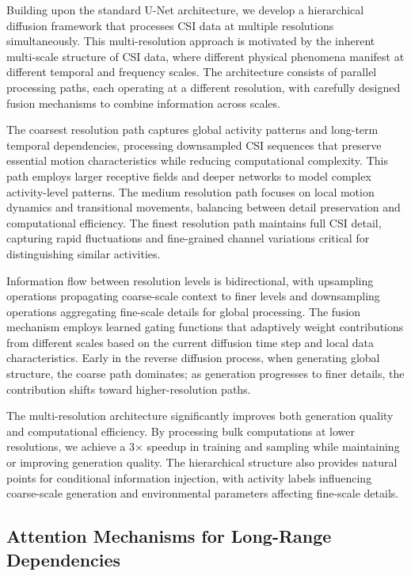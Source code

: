 \documentclass[journal]{IEEEtran}
\begin{document}
Building upon the standard U-Net architecture, we develop a hierarchical diffusion framework that processes CSI data at multiple resolutions simultaneously. This multi-resolution approach is motivated by the inherent multi-scale structure of CSI data, where different physical phenomena manifest at different temporal and frequency scales. The architecture consists of parallel processing paths, each operating at a different resolution, with carefully designed fusion mechanisms to combine information across scales.

The coarsest resolution path captures global activity patterns and long-term temporal dependencies, processing downsampled CSI sequences that preserve essential motion characteristics while reducing computational complexity. This path employs larger receptive fields and deeper networks to model complex activity-level patterns. The medium resolution path focuses on local motion dynamics and transitional movements, balancing between detail preservation and computational efficiency. The finest resolution path maintains full CSI detail, capturing rapid fluctuations and fine-grained channel variations critical for distinguishing similar activities.

Information flow between resolution levels is bidirectional, with upsampling operations propagating coarse-scale context to finer levels and downsampling operations aggregating fine-scale details for global processing. The fusion mechanism employs learned gating functions that adaptively weight contributions from different scales based on the current diffusion time step and local data characteristics. Early in the reverse diffusion process, when generating global structure, the coarse path dominates; as generation progresses to finer details, the contribution shifts toward higher-resolution paths.

The multi-resolution architecture significantly improves both generation quality and computational efficiency. By processing bulk computations at lower resolutions, we achieve a 3× speedup in training and sampling while maintaining or improving generation quality. The hierarchical structure also provides natural points for conditional information injection, with activity labels influencing coarse-scale generation and environmental parameters affecting fine-scale details.

\subsection{Attention Mechanisms for Long-Range Dependencies}
\end{document}
